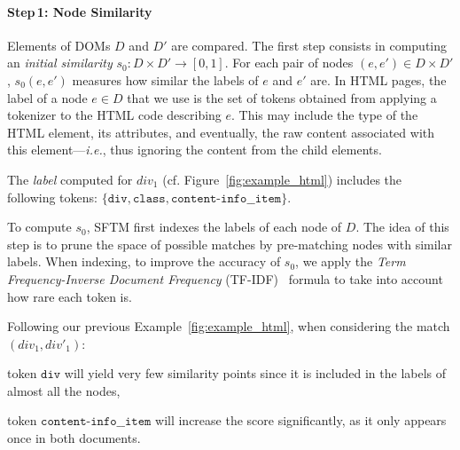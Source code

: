 \paragraph{Step\,1: Node Similarity}\label{erratum:sec:node_similarity}
Elements of DOMs $D$ and $D'$ are compared. 
The first step consists in computing an \emph{initial similarity} $s_0 : D \times D' \to [0, 1]$.
For each pair of nodes $(e, e') \in D \times D'$, $s_0(e,e')$ measures how similar the labels of $e$ and $e'$ are.
In HTML pages, the label of a node $e \in D$ that we use is the set of tokens obtained from applying a tokenizer to the HTML code describing $e$. 
This may include the type of the HTML element, its attributes, and eventually, the raw content associated with this element---\emph{i.e.}, thus ignoring the content from the child elements.
\begin{ex}
The \emph{label} computed for $div_1$ (cf. Figure~\ref{fig:example_html}) includes the following tokens: $\{\texttt{div}, \texttt{class}, \texttt{content-info\_\_item} \}$. %
\end{ex}

To compute $s_0$, SFTM first indexes the labels of each node of $D$.
The idea of this step is to prune the space of possible matches by pre-matching nodes with similar labels.
When indexing, to improve the accuracy of $s_0$, we apply the \emph{Term Frequency-Inverse Document Frequency} (TF-IDF)~\cite{jones1972statistical} formula to take into account how rare each token is.
\begin{ex}
    Following our previous Example~\ref{fig:example_html}, when considering the match $(div_1, div'_1)$:
    \begin{compactenum}
        \item token $\texttt{div}$ will yield very few similarity points since it is included in the labels of almost all the nodes,
        \item token $\texttt{content-info\_\_item}$ will increase the score significantly, as it only appears once in both documents.
    \end{compactenum}
\end{ex}

